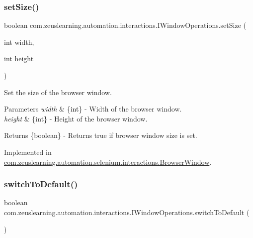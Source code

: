 \subsubsection{\texorpdfstring{set\+Size()}{setSize()}}
{\footnotesize\ttfamily boolean com.\+zeuslearning.\+automation.\+interactions.\+I\+Window\+Operations.\+set\+Size (\begin{DoxyParamCaption}\item[{int}]{width,  }\item[{int}]{height }\end{DoxyParamCaption})}

Set the size of the browser window.


\begin{DoxyParams}{Parameters}
{\em width} & \{int\} -\/ Width of the browser window. \\
\hline
{\em height} & \{int\} -\/ Height of the browser window.\\
\hline
\end{DoxyParams}
\begin{DoxyReturn}{Returns}
\{boolean\} -\/ Returns {\ttfamily true} if browser window size is set. 
\end{DoxyReturn}


Implemented in \hyperlink{classcom_1_1zeuslearning_1_1automation_1_1selenium_1_1interactions_1_1BrowserWindow_a471ae0f451cf2fb3a931478d114923c2}{com.\+zeuslearning.\+automation.\+selenium.\+interactions.\+Browser\+Window}.

\hypertarget{interfacecom_1_1zeuslearning_1_1automation_1_1interactions_1_1IWindowOperations_a6f6837d3d153ce5f6504689d2ec88613}{}\label{interfacecom_1_1zeuslearning_1_1automation_1_1interactions_1_1IWindowOperations_a6f6837d3d153ce5f6504689d2ec88613} 
\subsubsection{\texorpdfstring{switch\+To\+Default()}{switchToDefault()}}
{\footnotesize\ttfamily boolean com.\+zeuslearning.\+automation.\+interactions.\+I\+Window\+Operations.\+switch\+To\+Default (\begin{DoxyParamCaption}{ }\end{DoxyParamCaption})}

